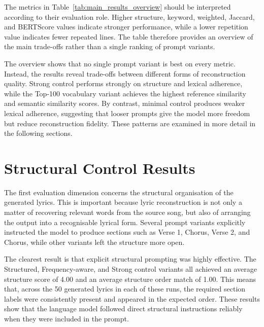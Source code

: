 The metrics in Table~\ref{tab:main_results_overview} should be interpreted according to their evaluation role. Higher structure, keyword, weighted, Jaccard, and BERTScore values indicate stronger performance, while a lower repetition value indicates fewer repeated lines. The table therefore provides an overview of the main trade-offs rather than a single ranking of prompt variants.

The overview shows that no single prompt variant is best on every metric. Instead, the results reveal trade-offs between different forms of reconstruction quality. Strong control performs strongly on structure and lexical adherence, while the Top-100 vocabulary variant achieves the highest reference similarity and semantic similarity scores. By contrast, minimal control produces weaker lexical adherence, suggesting that looser prompts give the model more freedom but reduce reconstruction fidelity. These patterns are examined in more detail in the following sections.


\section{Structural Control Results}

The first evaluation dimension concerns the structural organisation of the generated lyrics. This is important because lyric reconstruction is not only a matter of recovering relevant words from the source song, but also of arranging the output into a recognisable lyrical form. Several prompt variants explicitly instructed the model to produce sections such as Verse 1, Chorus, Verse 2, and Chorus, while other variants left the structure more open.

The clearest result is that explicit structural prompting was highly effective. The Structured, Frequency-aware, and Strong control variants all achieved an average structure score of 4.00 and an average structure order match of 1.00. This means that, across the 50 generated lyrics in each of these runs, the required section labels were consistently present and appeared in the expected order. These results show that the language model followed direct structural instructions reliably when they were included in the prompt.

